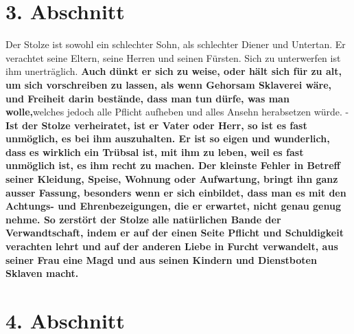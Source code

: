 \section{3. Abschnitt} \label{kap12_ab3}

Der Stolze ist sowohl ein schlechter Sohn, als schlechter
Diener und Untertan.
Er verachtet seine Eltern, seine Herren und seinen Fürsten. Sich
zu unterwerfen
ist ihm unerträglich. \textbf{Auch dünkt er sich zu weise, oder hält sich für zu
alt, um
sich vorschreiben zu lassen, als wenn Gehorsam Sklaverei wäre,
und Freiheit
darin bestände, dass man tun dürfe, was man wolle,}welches jedoch alle Pflicht
aufheben und alles Ansehn herabsetzen würde. - \textbf{Ist der Stolze
verheiratet, ist
er Vater oder Herr, so ist es fast unmöglich, es bei ihm auszuhalten. Er ist so
eigen und wunderlich, dass es wirklich ein Trübsal ist, mit ihm zu leben, weil
es fast unmöglich ist, es ihm recht zu machen. Der kleinste Fehler in Betreff
seiner Kleidung, Speise, Wohnung oder Aufwartung, bringt ihn ganz ausser Fassung,
besonders wenn er sich einbildet, dass man es mit den Achtungs- und
Ehrenbezeigungen, die er erwartet, nicht genau genug nehme. So zerstört der
Stolze alle natürlichen Bande der Verwandtschaft, indem er
auf der einen Seite
Pflicht und Schuldigkeit verachten lehrt und auf der anderen
Liebe in Furcht
verwandelt, aus seiner Frau eine Magd und aus seinen
Kindern und Dienstboten
Sklaven macht.}

\section{4. Abschnitt} \label{kap12_ab4}

